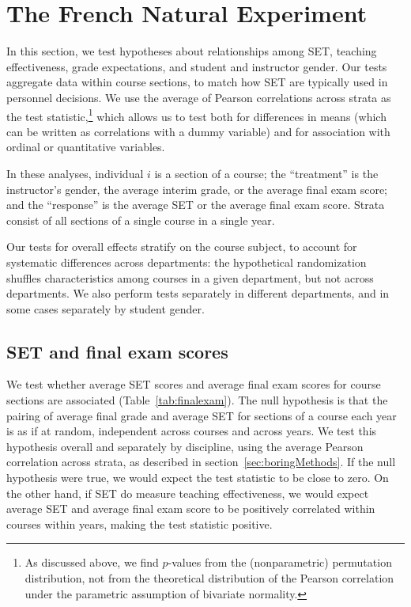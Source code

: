 \documentclass[12pt]{article}
\begin{document}
\section{The French Natural Experiment} \label{sec:Fr-results}
In this section, we test hypotheses about relationships among
SET, teaching effectiveness, grade expectations, and student and instructor gender.
Our tests aggregate data within course sections, to match how SET are typically
used in personnel decisions. 
We use the average of Pearson correlations across strata as the test statistic,\footnote{%
   As discussed above, we find $p$-values from the (nonparametric)
   permutation distribution, not from
   the theoretical distribution of the Pearson correlation 
   under the parametric assumption of bivariate normality.
} 
which allows us to test both for 
differences in means (which can be written as correlations with a dummy variable) and for 
association with ordinal or quantitative variables.

In these analyses, individual $i$ is a section of a course; 
the ``treatment'' is the instructor's gender, 
the average interim grade, or the average final exam score;
and the ``response'' is the average SET or the average final exam score.
Strata consist of all sections of a single course in a single year.

Our tests for overall effects stratify on the course subject, to account for systematic
differences across departments:
the hypothetical randomization shuffles characteristics among courses in a given
department, but not across departments.
We also perform tests separately in different departments, and in some cases separately by
student gender.

\subsection{SET and final exam scores} \label{sec:Fr-set-final}
We test whether average SET scores and average final exam scores for course
sections are associated (Table~\ref{tab:finalexam}). 
The null hypothesis is that the pairing
of average final grade and average SET for sections of a course each year is as if at random,
independent across courses and across years.
We test this hypothesis overall and separately by discipline, using the average Pearson correlation across strata, as described 
in section~\ref{sec:boringMethods}.
If the null hypothesis were true, we would expect the test statistic to be 
close to zero.
On the other hand, if SET do measure teaching effectiveness, we would expect average
SET and average final exam score to be positively correlated within courses within years, 
making the test statistic positive. 
\end{document}
